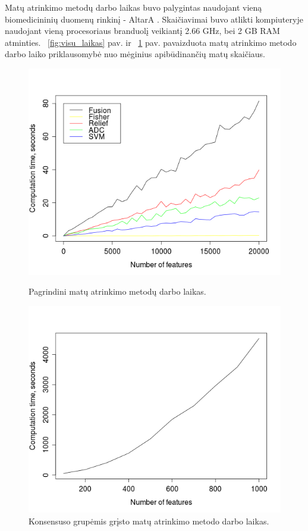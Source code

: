 Matų atrinkimo metodų darbo laikas buvo palygintas naudojant vieną biomedicininių duomenų rinkinį - AltarA \cite{altara}. Skaičiavimai buvo atlikti kompiuteryje naudojant vieną procesoriaus branduolį veikiantį 2.66 GHz, bei 2 GB RAM atminties. ~\ref{fig:visu_laikas} pav. ir ~\ref{fig:cgs_laikas} pav. pavaizduota matų atrinkimo metodo darbo laiko priklausomybė nuo mėginius apibūdinančių matų skaičiaus. 
\begin{figure}[hq]
\begin{minipage}[b]{0.5\linewidth}
\centering
\includegraphics[width=1\textwidth]{images/all_performance.png}
 \caption{Pagrindini matų atrinkimo metodų darbo laikas.}
 \label{fig:visu_laikas}
\end{minipage}
\hspace{0.5cm}
\begin{minipage}[b]{0.5\linewidth}
\centering
\includegraphics[width=1\textwidth]{images/cgs_performance.png}
 \caption{Konsensuso grupėmis grįsto matų atrinkimo metodo darbo laikas.}
 \label{fig:cgs_laikas}
\end{minipage}
\end{figure}
